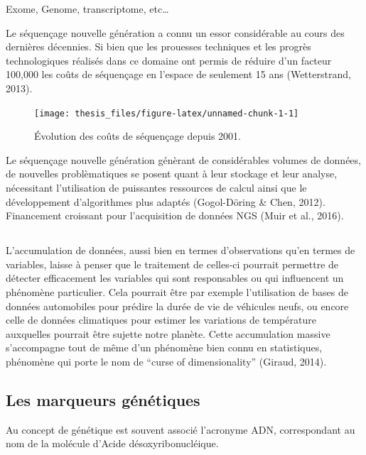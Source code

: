 \documentclass[12pt,twoside]{reedthesis}
\begin{document}
  Exome, Genome, transcriptome, etc\ldots{}
  
  Le séquençage nouvelle génération a connu un essor considérable au cours
  des dernières décennies. Si bien que les prouesses techniques et les
  progrès technologiques réalisés dans ce domaine ont permis de réduire
  d'un facteur 100,000 les coûts de séquençage en l'espace de seulement 15
  ans (Wetterstrand, 2013).
  
  \begin{figure}
  
  {\centering \texttt{[image: thesis\_files/figure-latex/unnamed-chunk-1-1]} 
  
  }
  
  \caption{Évolution des coûts de séquençage depuis 2001.}\label{fig:unnamed-chunk-1}
  \end{figure}
  
  Le séquençage nouvelle génération génèrant de considérables volumes de
  données, de nouvelles problèmatiques se posent quant à leur stockage et
  leur analyse, nécessitant l'utilisation de puissantes ressources de
  calcul ainsi que le développement d'algorithmes plus adaptés
  (Gogol-Döring \& Chen, 2012). Financement croissant pour l'acquisition
  de données NGS (Muir et al., 2016).
  
  \subsection{}\label{section}
  
  L'accumulation de données, aussi bien en termes d'observations qu'en
  termes de variables, laisse à penser que le traitement de celles-ci
  pourrait permettre de détecter efficacement les variables qui sont
  responsables ou qui influencent un phénomène particulier. Cela pourrait
  être par exemple l'utilisation de bases de données automobiles pour
  prédire la durée de vie de véhicules neufs, ou encore celle de données
  climatiques pour estimer les variations de température auxquelles
  pourrait être sujette notre planète. Cette accumulation massive
  s'accompagne tout de même d'un phénomène bien connu en statistiques,
  phénomène qui porte le nom de ``curse of dimensionality'' (Giraud,
  2014).
  
  \subsection{Les marqueurs génétiques}\label{les-marqueurs-genetiques}
  
  Au concept de génétique est souvent associé l'acronyme ADN,
  correspondant au nom de la molécule d'Acide désoxyribonucléique.
  
\end{document}
